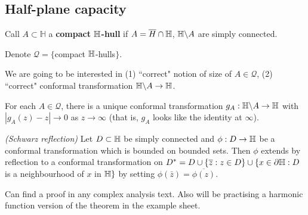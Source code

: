 \documentclass[12pt,a4paper]{article}
\newenvironment{proof}
{\begin{changemargin}{0.5cm}{0.5cm} 
	}%
	{\end{changemargin}
}
\newenvironment{p}
{\begin{proof} 
	}%
	{\end{proof}
}
\begin{document}
\subsection*{Half-plane capacity}

 Call $A\subset \mathbb{H}$ a \textbf{compact $\mathbb{H}$-hull} if $A = \overline{H} \cap \mathbb{H}$, $\mathbb{H} \backslash A$ are simply connected.

\quad Denote $\mathscr{Q} = \{$compact $\mathbb{H}$-hulls$\}$.
\s

We are going to be interested in (1) ``correct" notion of size of $A\in \mathscr{Q}$, (2) ``correct" conformal transformation $\mathbb{H} \backslash A \rightarrow \mathbb{H}$.
\s

 For each $A\in \mathscr{Q}$, there is a unique conformal transformation $g_A : \mathbb{H} \backslash A \rightarrow \mathbb{H}$ with $|g_A(z)-z| \rightarrow 0$ as $z\rightarrow \infty$ (that is, $g_A$ looks like the identity at $\infty$). 
\s

 \emph{(Schwarz reflection)} Let $D\subset \mathbb{H}$ be simply connected and $\phi : D \rightarrow \mathbb{H}$ be a conformal transformation which is bounded on bounded sets. Then $\phi$ extends by reflection to a conformal transformation on $D^* = D \cup \{\overline{z} : z\in D \} \cup \{ x\in \partial \mathbb{H} : D$ is a neighbourhood of $x$ in $\mathbb{H}\}$ by setting $\phi(\bar{z}) = \overline{\phi(z)}$.
\begin{p}
\pf Can find a proof in any complex analysis text. Also will be practising a harmonic function version of the theorem in the example sheet.
\end{p}
\s
\end{document}
